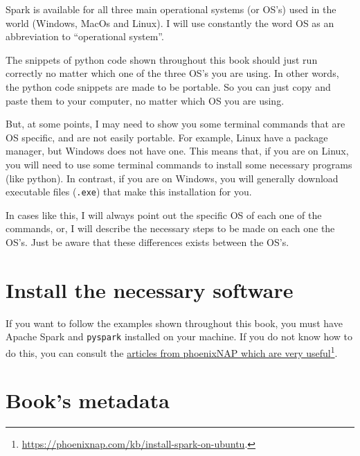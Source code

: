 \documentclass[
  11pt,
  letterpaper,
  DIV=11,
  numbers=noendperiod]{scrreprt}
\begin{document}

Spark is available for all three main operational systems (or OS's) used
in the world (Windows, MacOs and Linux). I will use constantly the word
OS as an abbreviation to ``operational system''.

The snippets of python code shown throughout this book should just run
correctly no matter which one of the three OS's you are using. In other
words, the python code snippets are made to be portable. So you can just
copy and paste them to your computer, no matter which OS you are using.

But, at some points, I may need to show you some terminal commands that
are OS specific, and are not easily portable. For example, Linux have a
package manager, but Windows does not have one. This means that, if you
are on Linux, you will need to use some terminal commands to install
some necessary programs (like python). In contrast, if you are on
Windows, you will generally download executable files (\texttt{.exe})
that make this installation for you.

In cases like this, I will always point out the specific OS of each one
of the commands, or, I will describe the necessary steps to be made on
each one the OS's. Just be aware that these differences exists between
the OS's.

\hypertarget{install-the-necessary-software}{%
\section*{Install the necessary
software}\label{install-the-necessary-software}}


If you want to follow the examples shown throughout this book, you must
have Apache Spark and \texttt{pyspark} installed on your machine. If you
do not know how to do this, you can consult the
\href{https://phoenixnap.com/kb/install-spark-on-ubuntu}{articles from
phoenixNAP which are very useful}\footnote{\url{https://phoenixnap.com/kb/install-spark-on-ubuntu}.}.

\hypertarget{books-metadata}{%
\section*{Book's metadata}\label{books-metadata}}
\end{document}
